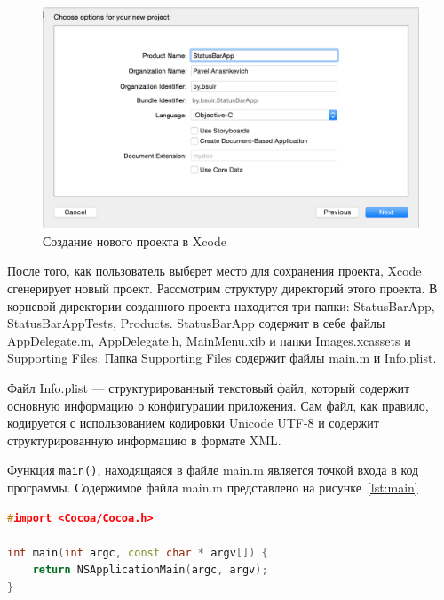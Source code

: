 \begin{figure}[h!]
  \centering
  \includegraphics[width=150mm]{pic/create_project.png}
  \caption{Создание нового проекта в Xcode}
  \label{pic:create_project}
\end{figure}

После того, как пользователь выберет место для сохранения проекта, Xcode
сгенерирует новый проект. Рассмотрим структуру директорий этого проекта.
В корневой директории созданного проекта находится три папки: StatusBarApp,
StatusBarAppTests, Products. StatusBarApp содержит в себе файлы AppDelegate.m,
AppDelegate.h, MainMenu.xib и папки Images.xcassets и Supporting Files. Папка
Supporting Files содержит файлы main.m и Info.plist.

Файл Info.plist --- структурированный текстовый файл, который содержит основную
информацию о конфигурации приложения. Сам файл, как правило, кодируется с
использованием кодировки Unicode UTF-8 и содержит структурированную информацию
в формате XML.

Функция \texttt{main()}, находящаяся в файле main.m является точкой входа в код программы.
Содержимое файла main.m представлено на рисунке~\ref{lst:main}
\begin{lstlisting}[basicstyle=\scriptsize\ttfamily,
                   numberstyle=\scriptsize\ttfamily,
                   xleftmargin=7mm,
                   language=C++,caption=Содержимое файла main.m,
                   label=lst:main]
#import <Cocoa/Cocoa.h>

int main(int argc, const char * argv[]) {
    return NSApplicationMain(argc, argv);
}
\end{lstlisting}

